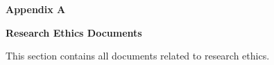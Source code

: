 %
%
%                 

\textbf{\Huge Appendix A}
\bigskip

\textbf{\LARGE Research Ethics Documents}

\bigskip
This section contains all documents related to research ethics.

\newpage
\setlength{\voffset}{0cm}
\setlength{\hoffset}{0cm}






